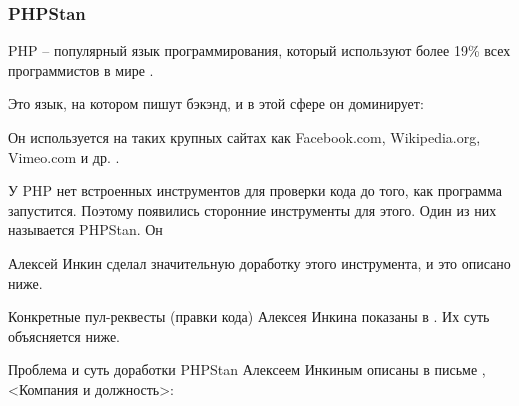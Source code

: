 \subsubsection{PHPStan}
\label{subsubsec:ContributionsPhpStan}


PHP -- популярный язык программирования, который используют более 19\% всех программистов в мире .

Это язык, на котором пишут бэкэнд, и в этой сфере он доминирует:


Он используется на таких крупных сайтах как Facebook.com, Wikipedia.org, Vimeo.com и др. .

У PHP нет встроенных инструментов для проверки кода до того, как программа запустится.
Поэтому появились сторонние инструменты для этого.
Один из них называется PHPStan.
Он


Алексей Инкин сделал значительную доработку этого инструмента, и это описано ниже.



Конкретные пул-реквесты (правки кода) Алексея Инкина показаны в .
Их суть объясняется ниже.



Проблема и суть доработки PHPStan Алексеем Инкиным описаны
в письме \MrPhpOne, <Компания и должность>:

